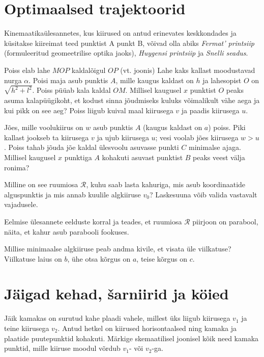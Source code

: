 \documentclass[a4paper,11pt,twocolumn]{article}
\begin{document}
\section{Optimaalsed trajektoorid}
Kinemaatikaülesannetes, kus kiirused on antud erinevates keskkondades ja küsitakse kiireimat teed punktist A punkt B, võivad olla abiks \textit{Fermat' printsiip} (formuleeritud geomeetrilise optika jaoks), \textit{Huygensi printsiip} ja \textit{Snelli seadus}.
\begin{question}[kin4][3.8cm]
	Poiss elab lahe $ MOP $ kaldalõigul $ OP $ (vt. joonis) Lahe kaks kallast moodustavad nurga $ \alpha $. Poisi maja asub punktis $ A $, mille kaugus kaldast on $ h $ ja lahesopist $ O $ on $\sqrt{h^2+l^2} $. Poiss püüab kala kaldal $ OM $. Millisel kaugusel $ x $ punktist $ O $ peaks asuma kalapüügikoht, et kodust sinna jõudmiseks kuluks võimalikult vähe aega ja kui pikk on see aeg? Poiss liigub kuival maal kiirusega $ v $ ja paadis kiirusega $ u $.
\end{question} 
\begin{question}[kin5][5.3cm]
	Jões, mille voolukiirus on $ w $ asub punktis $ A $ (kaugus kaldast on $ a $) poiss. Piki kallast jookseb ta kiirusega $ v $ ja ujub kiirusega $ u $; vesi voolab jões kiirusega $ w>u $. Poiss tahab jõuda jõe kaldal ülesvoolu asuvasse punkti $ C $ minimalse ajaga. Millisel kaugusel $ x $ punktiga $ A $ kohakuti asuvast punktist $ B $ peaks veest välja ronima?
\end{question}
\begin{question}
	Milline on see ruumiosa $ \mathcal{R} $, kuhu saab lasta kahuriga, mis asub koordinaatide alguspunktis ja mis annab kuulile algkiiruse $ v_0 $? Laskesuuna võib valida vastavalt vajadusele.
\end{question}
\begin{question}
	Eelmise ülesannete eelduste korral ja teades, et ruumiosa $ \mathcal{R} $ piirjoon on parabool, näita, et kahur asub parabooli fookuses.
\end{question}
\begin{question}
	Millise minimaalse algkiiruse peab andma kivile, et visata üle viilkatuse? Viilkatuse laius on $ b $, ühe otsa kõrgus on $ a $, teise kõrgus on $ c $.
\end{question}

\section{Jäigad kehad, šarniirid ja köied}
\begin{question}[kin6][5cm]
	Jäik kamakas on surutud kahe plaadi vahele, millest üks liigub kiirusega $ v_1 $ ja teine kiirusega $ v_2 $. Antud hetkel on kiirused horisontaalsed ning kamaka ja plaatide puutepunktid kohakuti. Märkige skemaatilisel joonisel kõik need kamaka punktid, mille kiiruse moodul võrdub $ v_1 $- või $ v_2 $-ga.
\end{question}
\end{document}
